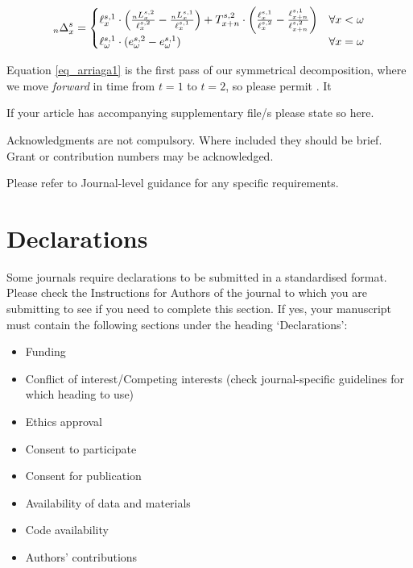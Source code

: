 \documentclass[sn-apa,pdflatex]{sn-jnl}
\theoremstyle{remark}
\theoremstyle{definition}
\providecommand{\tightlist}{%
  \setlength{\itemsep}{0pt}\setlength{\parskip}{0pt}}
\begin{document}
\begin{equation}
\label{eq_arriaga1}
 {}_n\Delta_x^s = \begin{cases}\ell_x^{s,1} \cdot \left( \frac{{}_nL_x^{s,2}}{\ell_x^{s,2}} - \frac{{}_nL_x^{s,1}}{\ell_x^{s,1}}\right)+T_{x+n}^{s,2}\cdot\left(\frac{\ell_x^{s,1}}{\ell_x^{s,2}} - \frac{\ell_{x+n}^{s,1}}{\ell_{x+n}^{s,2}}\right)  & \text{$ \forall x < \omega$}  \\
  \ell_\omega ^{s,1} \cdot (e_\omega^{s,2} -e_\omega^{s,1} ) & \text{$\forall x = \omega $}
  \end{cases}
\end{equation}

Equation \eqref{eq_arriaga1} is the first pass of our symmetrical
decomposition, where we move \emph{forward} in time from \(t=1\) to
\(t=2\), so please permit . It

\backmatter


If your article has accompanying supplementary file/s please state so
here.


Acknowledgments are not compulsory. Where included they should be brief.
Grant or contribution numbers may be acknowledged.

Please refer to Journal-level guidance for any specific requirements.

\hypertarget{declarations}{%
\section*{Declarations}\label{declarations}}

Some journals require declarations to be submitted in a standardised
format. Please check the Instructions for Authors of the journal to
which you are submitting to see if you need to complete this section. If
yes, your manuscript must contain the following sections under the
heading `Declarations':

\begin{itemize}
\tightlist
\item
  Funding
\item
  Conflict of interest/Competing interests (check journal-specific
  guidelines for which heading to use)
\item
  Ethics approval
\item
  Consent to participate
\item
  Consent for publication
\item
  Availability of data and materials
\item
  Code availability
\item
  Authors' contributions
\end{itemize}
\end{document}

